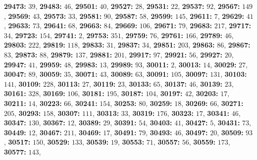 \textsf{\bfseries 29473:} $39$, \textsf{\bfseries 29483:} $46$, \textsf{\bfseries 29501:} $40$, \textsf{\bfseries 29527:} $28$, \textsf{\bfseries 29531:} $22$, \textsf{\bfseries 29537:} $92$, \textsf{\bfseries 29567:} $149$, \textsf{\bfseries 29569:} $43$, \textsf{\bfseries 29573:} $33$, \textsf{\bfseries 29581:} $90$, \textsf{\bfseries 29587:} $58$, \textsf{\bfseries 29599:} $145$, \textsf{\bfseries 29611:} $7$, \textsf{\bfseries 29629:} $41$, \textsf{\bfseries 29633:} $73$, \textsf{\bfseries 29641:} $68$, \textsf{\bfseries 29663:} $84$, \textsf{\bfseries 29669:} $106$, \textsf{\bfseries 29671:} $79$, \textsf{\bfseries 29683:} $217$, \textsf{\bfseries 29717:} $34$, \textsf{\bfseries 29723:} $154$, \textsf{\bfseries 29741:} $2$, \textsf{\bfseries 29753:} $351$, \textsf{\bfseries 29759:} $76$, \textsf{\bfseries 29761:} $166$, \textsf{\bfseries 29789:} $46$, \textsf{\bfseries 29803:} $222$, \textsf{\bfseries 29819:} $118$, \textsf{\bfseries 29833:} $31$, \textsf{\bfseries 29837:} $34$, \textsf{\bfseries 29851:} $203$, \textsf{\bfseries 29863:} $86$, \textsf{\bfseries 29867:} $83$, \textsf{\bfseries 29873:} $88$, \textsf{\bfseries 29879:} $137$, \textsf{\bfseries 29881:} $201$, \textsf{\bfseries 29917:} $97$, \textsf{\bfseries 29921:} $56$, \textsf{\bfseries 29927:} $20$, \textsf{\bfseries 29947:} $41$, \textsf{\bfseries 29959:} $48$, \textsf{\bfseries 29983:} $13$, \textsf{\bfseries 29989:} $93$, \textsf{\bfseries 30011:} $2$, \textsf{\bfseries 30013:} $14$, \textsf{\bfseries 30029:} $27$, \textsf{\bfseries 30047:} $89$, \textsf{\bfseries 30059:} $35$, \textsf{\bfseries 30071:} $43$, \textsf{\bfseries 30089:} $63$, \textsf{\bfseries 30091:} $105$, \textsf{\bfseries 30097:} $131$, \textsf{\bfseries 30103:} $141$, \textsf{\bfseries 30109:} $228$, \textsf{\bfseries 30113:} $27$, \textsf{\bfseries 30119:} $23$, \textsf{\bfseries 30133:} $65$, \textsf{\bfseries 30137:} $46$, \textsf{\bfseries 30139:} $23$, \textsf{\bfseries 30161:} $328$, \textsf{\bfseries 30169:} $106$, \textsf{\bfseries 30181:} $195$, \textsf{\bfseries 30187:} $104$, \textsf{\bfseries 30197:} $42$, \textsf{\bfseries 30203:} $17$, \textsf{\bfseries 30211:} $14$, \textsf{\bfseries 30223:} $66$, \textsf{\bfseries 30241:} $154$, \textsf{\bfseries 30253:} $80$, \textsf{\bfseries 30259:} $18$, \textsf{\bfseries 30269:} $66$, \textsf{\bfseries 30271:} $205$, \textsf{\bfseries 30293:} $158$, \textsf{\bfseries 30307:} $111$, \textsf{\bfseries 30313:} $33$, \textsf{\bfseries 30319:} $176$, \textsf{\bfseries 30323:} $17$, \textsf{\bfseries 30341:} $46$, \textsf{\bfseries 30347:} $130$, \textsf{\bfseries 30367:} $12$, \textsf{\bfseries 30389:} $29$, \textsf{\bfseries 30391:} $54$, \textsf{\bfseries 30403:} $41$, \textsf{\bfseries 30427:} $5$, \textsf{\bfseries 30431:} $73$, \textsf{\bfseries 30449:} $12$, \textsf{\bfseries 30467:} $211$, \textsf{\bfseries 30469:} $17$, \textsf{\bfseries 30491:} $79$, \textsf{\bfseries 30493:} $46$, \textsf{\bfseries 30497:} $20$, \textsf{\bfseries 30509:} $93$, \textsf{\bfseries 30517:} $150$, \textsf{\bfseries 30529:} $133$, \textsf{\bfseries 30539:} $19$, \textsf{\bfseries 30553:} $71$, \textsf{\bfseries 30557:} $56$, \textsf{\bfseries 30559:} $173$, \textsf{\bfseries 30577:} $143$, 
